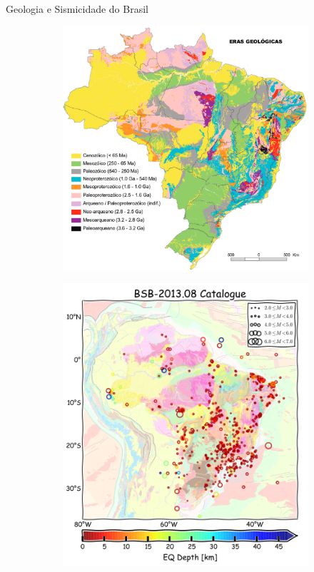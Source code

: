 \documentclass[ucs,8pt]{beamer}
\begin{document}
\begin{frame}{Geologia e Sismicidade do Brasil}
\begin{figure}[H]
	\scriptsize
	\centering
	\begin{subfigure}[t]{0.48\textwidth}
	  \centering
	  \includegraphics[width=1.0\textwidth]{tectonico_brasil} 
	  \label{fig:br_tec} 
	\end{subfigure}
	\begin{subfigure}[t]{0.48\textwidth}
	  \centering
	  \includegraphics[width=1.0\textwidth]{seismicity_br} 

\end{subfigure}
\end{figure}
\end{frame}
\end{document}
